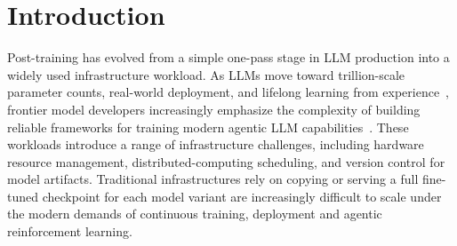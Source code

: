 \documentclass{llmxive}
\begin{document}
\section{Introduction}

Post-training has evolved from a simple one-pass stage in LLM production into a widely used infrastructure workload. As LLMs move toward trillion-scale parameter counts, real-world deployment, and lifelong learning from experience~\citep{yao_second_half_2025,silver_sutton_experience_2025}, frontier model developers increasingly emphasize the complexity of building reliable frameworks for training modern agentic LLM capabilities~\citep{deepseek_v4_release_2026,deepseekv4_2026,glm5_2026,kimi_k25_2026,minimax_m27_2026,qwen35_2026,openai_gpt55_2026,anthropic_opus45_2025}. These workloads introduce a range of infrastructure challenges, including hardware resource management, distributed-computing scheduling, and version control for model artifacts. Traditional infrastructures rely on copying or serving a full fine-tuned checkpoint for each model variant are increasingly difficult to scale under the modern demands of continuous training, deployment and agentic reinforcement learning.

% 
\end{document}
